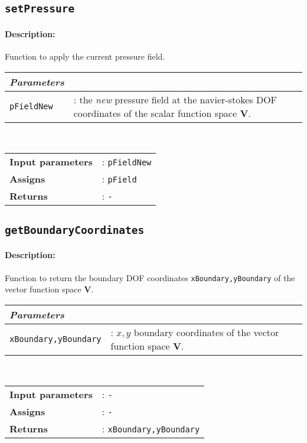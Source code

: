 \subsection{\texttt{setPressure}}
	\paragraph{Description:} Function to apply the current pressure field.\\
	
	    \begin{tabular}{lp{10cm}}
			\textit{Parameters} & \\ \hline
			\texttt{pFieldNew} &: the \textit{new} pressure field at the navier-stokes DOF coordinates of the scalar function space $\mathbf{V}$.\\ 
		\end{tabular} \vspace{5 mm}
	\\		
	\begin{tabular}{lp{10cm}}
		\textbf{Input parameters} &: \texttt{pFieldNew}\\ 
		\textbf{Assigns} &: \texttt{pField}\\ 			
		\textbf{Returns} &: \texttt{-}\\ 					
	\end{tabular}

\subsection{\texttt{getBoundaryCoordinates}}
	\paragraph{Description:} Function to return the boundary DOF coordinates \texttt{xBoundary,yBoundary} of the vector function space $\mathbf{V}$.\\
	
		\begin{tabular}{lp{10cm}}
			\textit{Parameters} & \\ \hline
			\texttt{xBoundary,yBoundary} &: $x,y$ boundary coordinates of the vector function space  $\mathbf{V}$. \\ 
		\end{tabular} \vspace{5 mm}
	\\
	\begin{tabular}{lp{10cm}}
		\textbf{Input parameters} &: \texttt{-}\\ 
		\textbf{Assigns} &: \texttt{-}\\ 			
		\textbf{Returns} &: \texttt{xBoundary,yBoundary}\\ 					
	\end{tabular}	

